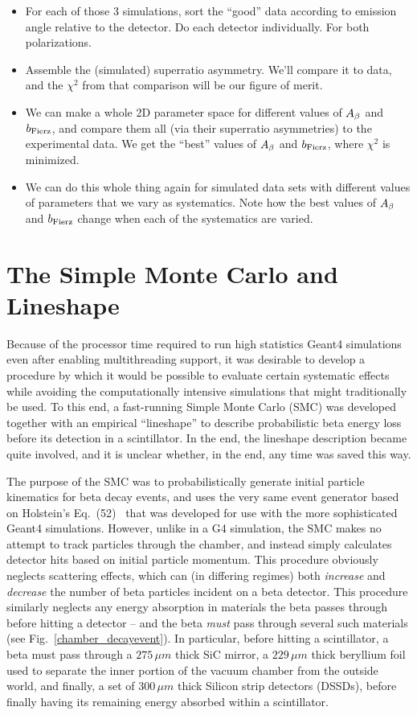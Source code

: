\begin{itemize}
\begin{itemize}
		\end{itemize}
	\item For each of those 3 simulations, sort the ``good'' data according to emission angle relative to the detector.  Do each detector individually.  For both polarizations.
	\item Assemble the (simulated) superratio asymmetry.  We'll compare it to data, and the $\chi^2$ from that comparison will be our figure of merit.  
	\item We can make a whole 2D parameter space for different values of $A_{\beta}$ and $b_{\mathrm{Fierz}}$, and compare them all (via their superratio asymmetries) to the experimental data.  We get the ``best'' values of $A_{\beta}$ and $b_{\mathrm{Fierz}}$, where $\chi^2$ is minimized.
	\item We can do this whole thing again for simulated data sets with different values of parameters that we vary as systematics.  Note how the best values of $A_{\beta}$ and $b_{\mathrm{Fierz}}$ change when each of the systematics are varied.
\end{itemize}


\section{The Simple Monte Carlo and Lineshape}
\label{sec:lineshape}
Because of the processor time required to run high statistics Geant4 simulations even after enabling multithreading support, it was desirable to develop a procedure by which it would be possible to evaluate certain systematic effects while avoiding the computationally intensive simulations that might traditionally be used.  To this end, a fast-running Simple Monte Carlo (SMC) was developed together with an empirical ``lineshape'' to describe probabilistic beta energy loss before its detection in a scintillator.  In the end, the lineshape description became quite involved, and it is unclear whether, in the end, any time was saved this way. 

The purpose of the SMC was to probabilistically generate initial particle kinematics for beta decay events, and uses the very same event generator based on Holstein's Eq.~(52)~\cite{holstein} that was developed for use with the more sophisticated Geant4 simulations.  However, unlike in a G4 simulation, the SMC makes no attempt to track particles through the chamber, and instead simply calculates detector hits based on initial particle momentum.  This procedure obviously neglects scattering effects, which can (in differing regimes) both \emph{increase} and \emph{decrease} the number of beta particles incident on a beta detector.  This procedure similarly neglects any energy absorption in materials the beta passes through before hitting a detector -- and the beta \emph{must} pass through several such materials (see Fig.~\ref{chamber_decayevent}).  In particular, before hitting a scintillator, a beta must pass through a $275\,\mu m$ thick SiC mirror, a $229\,\mu m$ thick beryllium foil used to separate the inner portion of the vacuum chamber from the outside world, and finally, a set of $300\,\mu m$ thick Silicon strip detectors (DSSDs), before finally having its remaining energy absorbed within a scintillator.  

